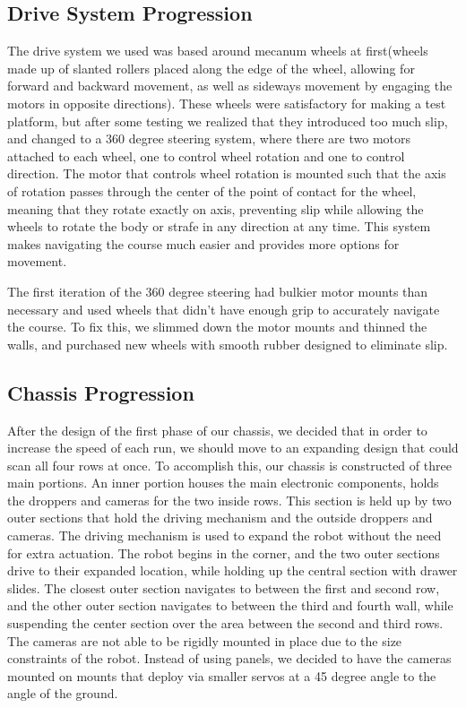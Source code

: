 \documentclass[11pt, twoside]{report}
\begin{document}
\subsection{Drive System Progression}
The drive system we used was based around mecanum wheels at first(wheels made up of slanted rollers placed along the edge of the wheel, allowing for forward and backward movement, as well as sideways movement by engaging the motors in opposite directions).  These wheels were satisfactory for making a test platform, but after some testing we realized that they introduced too much slip, and changed to a 360 degree steering system, where there are two motors attached to each wheel, one to control wheel rotation and one to control direction.  The motor that controls wheel rotation is mounted such that the axis of rotation passes through the center of the point of contact for the wheel, meaning that they rotate exactly on axis, preventing slip while allowing the wheels to rotate the body or strafe in any direction at any time.  This system makes navigating the course much easier and provides more options for movement.

The first iteration of the 360 degree steering had bulkier motor mounts than necessary and used wheels that didn't have enough grip to accurately navigate the course.  To fix this, we slimmed down the motor mounts and thinned the walls, and purchased new wheels with smooth rubber designed to eliminate slip.  

\subsection{Chassis Progression}
After the design of the first phase of our chassis, we decided that in order to increase the speed of each run, we should move to an expanding design that could scan all four rows at once.  To accomplish this, our chassis is constructed of three main portions.  An inner portion houses the main electronic components, holds the droppers and cameras for the two inside rows.  This section is held up by two outer sections that hold the driving mechanism and the outside droppers and cameras.  The driving mechanism is used to expand the robot without the need for extra actuation.  The robot begins in the corner, and the two outer sections drive to their expanded location, while holding up the central section with drawer slides.  The closest outer section navigates to between the first and second row, and the other outer section navigates to between the third and fourth wall, while suspending the center section over the area between the second and third rows.  The cameras are not able to be rigidly mounted in place due to the size constraints of the robot.  Instead of using panels, we decided to have the cameras mounted on mounts that deploy via smaller servos at a 45 degree angle to the angle of the ground.  
\end{document}
